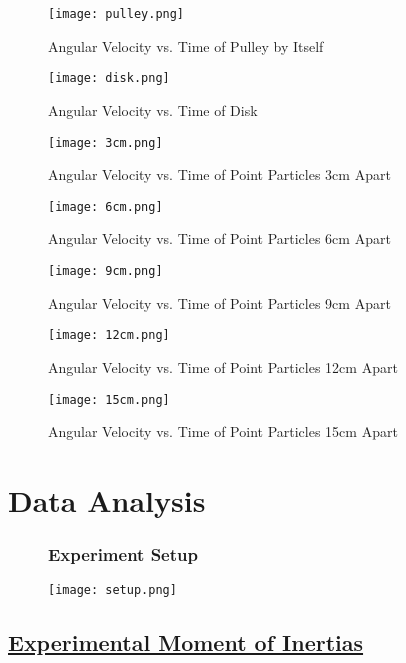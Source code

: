 \documentclass[fleqn]{article}
\begin{document}
\begin{figure}[H]
	\caption*{Angular Velocity vs. Time of Pulley by Itself}
	\texttt{[image: pulley.png]}
\end{figure}


\begin{figure}[H]
	\caption*{Angular Velocity vs. Time of Disk}
	\texttt{[image: disk.png]}
\end{figure}

\begin{figure}[H]
	\caption*{Angular Velocity vs. Time of Point Particles 3cm Apart}
	\texttt{[image: 3cm.png]}
\end{figure}

\begin{figure}[H]
	\caption*{Angular Velocity vs. Time of Point Particles 6cm Apart}
	\texttt{[image: 6cm.png]}
\end{figure}

\begin{figure}[H]
	\caption*{Angular Velocity vs. Time of Point Particles 9cm Apart}
	\texttt{[image: 9cm.png]}
\end{figure}

\begin{figure}[H]
	\caption*{Angular Velocity vs. Time of Point Particles 12cm Apart}
	\texttt{[image: 12cm.png]}
\end{figure}

\begin{figure}[H]
	\caption*{Angular Velocity vs. Time of Point Particles 15cm Apart}
	\texttt{[image: 15cm.png]}
\end{figure}

\section*{Data Analysis}

\begin{figure}[H]
	\subsubsection*{Experiment Setup}
	\texttt{[image: setup.png]}
\end{figure}

\subsection*{\underline{Experimental Moment of Inertias}}
\end{document}
